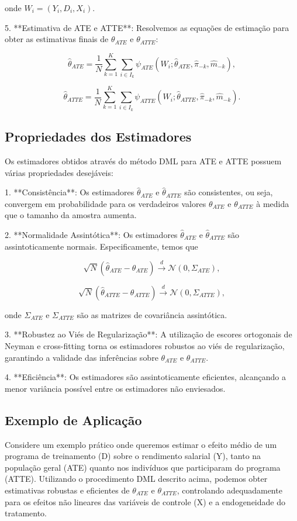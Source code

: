 \documentclass[a4paper,12pt]{article}[abntex2]
\begin{document}
onde $W_i = (Y_i, D_i, X_i)$.

5. **Estimativa de ATE e ATTE**: Resolvemos as equações de estimação para obter as estimativas finais de $\theta_{ATE}$ e $\theta_{ATTE}$:

\[
\hat{\theta}_{ATE} = \frac{1}{N} \sum_{k=1}^K \sum_{i \in I_k} \psi_{ATE}(W_i; \hat{\theta}_{ATE}, \hat{\pi}_{-k}, \hat{m}_{-k}),
\]

\[
\hat{\theta}_{ATTE} = \frac{1}{N} \sum_{k=1}^K \sum_{i \in I_k} \psi_{ATTE}(W_i; \hat{\theta}_{ATTE}, \hat{\pi}_{-k}, \hat{m}_{-k}).
\]

\subsection*{Propriedades dos Estimadores}

Os estimadores obtidos através do método DML para ATE e ATTE possuem várias propriedades desejáveis:

1. **Consistência**: Os estimadores $\hat{\theta}_{ATE}$ e $\hat{\theta}_{ATTE}$ são consistentes, ou seja, convergem em probabilidade para os verdadeiros valores $\theta_{ATE}$ e $\theta_{ATTE}$ à medida que o tamanho da amostra aumenta.

2. **Normalidade Assintótica**: Os estimadores $\hat{\theta}_{ATE}$ e $\hat{\theta}_{ATTE}$ são assintoticamente normais. Especificamente, temos que

\[
\sqrt{N}(\hat{\theta}_{ATE} - \theta_{ATE}) \xrightarrow{d} \mathcal{N}(0, \Sigma_{ATE}),
\]

\[
\sqrt{N}(\hat{\theta}_{ATTE} - \theta_{ATTE}) \xrightarrow{d} \mathcal{N}(0, \Sigma_{ATTE}),
\]

onde $\Sigma_{ATE}$ e $\Sigma_{ATTE}$ são as matrizes de covariância assintótica.

3. **Robustez ao Viés de Regularização**: A utilização de escores ortogonais de Neyman e cross-fitting torna os estimadores robustos ao viés de regularização, garantindo a validade das inferências sobre $\theta_{ATE}$ e $\theta_{ATTE}$.

4. **Eficiência**: Os estimadores são assintoticamente eficientes, alcançando a menor variância possível entre os estimadores não enviesados.

\subsection*{Exemplo de Aplicação}

Considere um exemplo prático onde queremos estimar o efeito médio de um programa de treinamento (D) sobre o rendimento salarial (Y), tanto na população geral (ATE) quanto nos indivíduos que participaram do programa (ATTE). Utilizando o procedimento DML descrito acima, podemos obter estimativas robustas e eficientes de $\theta_{ATE}$ e $\theta_{ATTE}$, controlando adequadamente para os efeitos não lineares das variáveis de controle (X) e a endogeneidade do tratamento.
\end{document}
